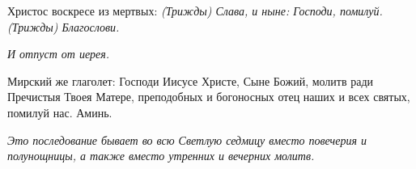 \normalfont{}Христос воскресе из мертвых: \itshape (Трижды\normalfont{}) Слава, и ныне: Господи, помилуй. (\itshape Трижды\normalfont{}) Благослови. 

\itshape И отпуст от иерея. 



Мирский же глаголе\normalfont{}т: Господи Иисусе Христе, Сыне Божий, молитв ради Пречистыя Твоея Матере, преподобных и богоносных отец наших и всех святых, помилуй нас. Аминь. 





\itshape  *Это последование бывает во всю Светлую седмицу вместо повечерия и полунощницы, а также вместо утренних и вечерних молитв.\normalfont{}



\bigskip\bigskip\mychapterending